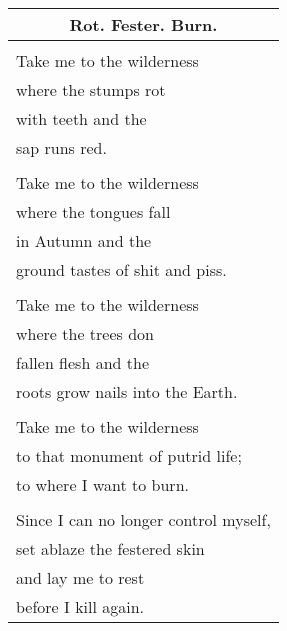 \documentclass{article}
\begin{document}
\newcommand{\h}{\hspace*{2ex}}
\newcommand{\hh}{\hspace*{4ex}}
\newcommand{\hhh}{\hspace*{6ex}}

\begin{center}
\begin{tabular}{l}
\multicolumn{1}{c}{\textbf{Rot. Fester. Burn.}} \\\hline
\\
Take me to the wilderness \\
\h{}where the stumps rot \\
\h{}with teeth and the \\
\h{}sap runs red. \\ %
\\
Take me to the wilderness \\
\h{}where the tongues fall \\
\h{}in Autumn and the \\
\h{}ground tastes of shit and piss. \\
\\
Take me to the wilderness \\
\h{}where the trees don \\
\h{}fallen flesh and the \\
\h{}roots grow nails into the Earth. \\
\\
Take me to the wilderness \\
\h{}to that monument of putrid life; \\
\h{}to where I want to burn. \\
\\
Since I can no longer control myself, \\
\h{}set ablaze the festered skin \\
\h{}and lay me to rest \\
\h{}before I kill again. \\
\end{tabular}
\end{center}
\end{document}
